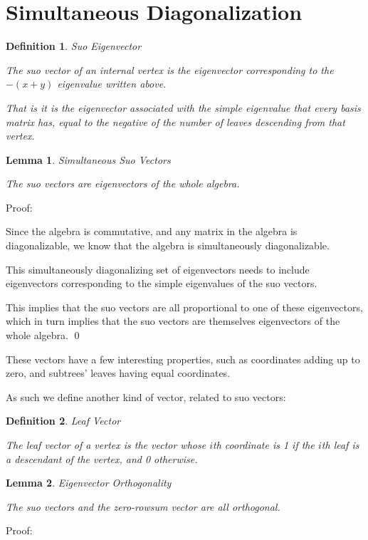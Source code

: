 \documentclass[10pt,a4paper]{report}
\newtheorem{definition}{Definition}
\newtheorem{lemma}{Lemma}
\begin{document}
\section{Simultaneous Diagonalization}

\begin{definition} Suo Eigenvector

	The suo vector of an internal vertex is the eigenvector corresponding to
	the $-(x+y)$ eigenvalue written above.

	That is it is the eigenvector associated with the simple eigenvalue that
	every basis matrix has, equal to the negative of the number of leaves
	descending from that vertex.
\end{definition}

\begin{lemma} Simultaneous Suo Vectors

	The suo vectors are eigenvectors of the whole algebra.
\end{lemma}
Proof:

Since the algebra is commutative, and any matrix in the algebra is
diagonalizable, we know that the algebra is simultaneously diagonalizable.

This simultaneously diagonalizing set of eigenvectors needs to include
eigenvectors corresponding to the simple eigenvalues of the suo vectors.

This implies that the suo vectors are all proportional to one of these
eigenvectors, which in turn implies that the suo vectors are themselves
eigenvectors of the whole algebra. \qed

These vectors have a few interesting properties, such as coordinates adding up
to zero, and subtrees' leaves having equal coordinates.

As such we define another kind of vector, related to suo vectors:

\begin{definition} Leaf Vector

	The leaf vector of a vertex is the vector whose $i$th coordinate is 1 if the
	$i$th leaf is a descendant of the vertex, and 0 otherwise.
\end{definition}

\begin{lemma} Eigenvector Orthogonality

	The suo vectors and the zero-rowsum vector are all orthogonal.
\end{lemma}

Proof:
\end{document}
